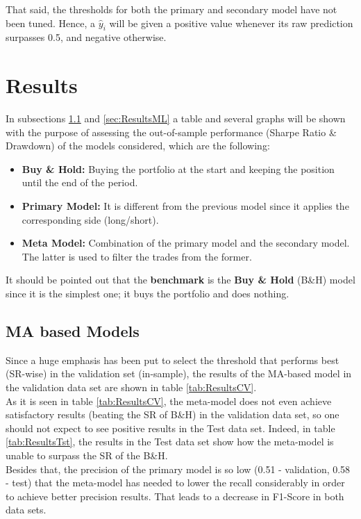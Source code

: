 \documentclass[a4paper]{report}
\begin{document}
That said, the thresholds for both the primary and secondary model have not 
been tuned. Hence, a $\widehat{y}_i$ will be given a positive value whenever 
its raw prediction surpasses 0.5, and negative otherwise.

\section{Results}
In subsections \ref{sec:ResultsMA} and \ref{sec:ResultsML} a table and 
several graphs will be shown with the purpose of assessing the out-of-sample 
performance (Sharpe Ratio \& Drawdown) of the models considered, which are 
the following:
\begin{itemize}
	\item \textbf{Buy \& Hold:} Buying the portfolio at the start and 
	keeping the position until the end of the period.
	
	\item \textbf{Primary Model:} It is different from the previous model 
	since it applies the corresponding side (long/short).
	
	\item \textbf{Meta Model:} Combination of the primary model and the 
	secondary model. The latter is used to filter the trades 	from the former.
\end{itemize}

It should be pointed out that the \textbf{benchmark} is the \textbf{Buy \& 
Hold} (B\&H) model since it is the simplest one; it buys the portfolio and 
does nothing.

\subsection{MA based Models}
\label{sec:ResultsMA}
Since a huge emphasis has been put to select the threshold that performs 
best (SR-wise) in the validation set (in-sample), the results of the MA-based 
model in the validation data set are shown in table \ref{tab:ResultsCV}.\\

As it is seen in table \ref{tab:ResultsCV}, the meta-model does not even 
achieve satisfactory results (beating the SR of B\&H) in the validation 
data set, so one should not expect to see positive results in the Test data 
set. Indeed, in table \ref{tab:ResultsTst}, the results in the Test data set 
show how the meta-model is unable to surpass the SR of the B\&H.\\

Besides that, the precision of the primary model is so low (0.51 - 
validation, 0.58 - test) that the meta-model has needed to lower the recall 
considerably in order to achieve better precision results. That leads to a 
decrease in F1-Score in both data sets.\\
\end{document}
